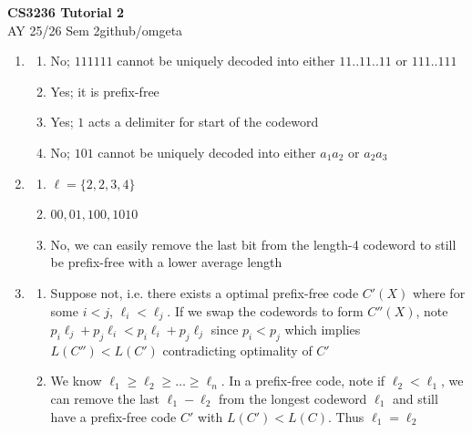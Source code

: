 \documentclass[12pt, a4paper]{article}
\newcommand{\mytitle}{CS3236 Tutorial 2}
\newcommand{\myauthor}{github/omgeta}
\newcommand{\mydate}{AY 25/26 Sem 2}
\begin{document}
\raggedright
\footnotesize
\begin{center}
{\normalsize{\textbf{\mytitle}}} \\
{\footnotesize{\mydate\hspace{2pt}\textemdash\hspace{2pt}\myauthor}}
\end{center}
\begin{enumerate}[Q\arabic*.]
  \item 
    \begin{enumerate}
      \item No; $111111$ cannot be uniquely decoded into either $11..11..11$ or $111..111$
      \item Yes; it is prefix-free 
      \item Yes; $1$ acts a delimiter for start of the codeword
      \item No; $101$ cannot be uniquely decoded into either $a_1a_2$ or $a_2a_3$
    \end{enumerate}

  \item 
    \begin{enumerate}
      \item $\ell =\{2, 2, 3, 4\}$
      \item $00, 01, 100, 1010$
      \item No, we can easily remove the last bit from the length-4 codeword to still be prefix-free with a lower average length
    \end{enumerate}

  \item 
    \begin{enumerate}
      \item Suppose not, i.e. there exists a optimal prefix-free code $C'(X)$ where for some $i < j$, $\ell_i < \ell_j$. If we swap the codewords to form $C''(X)$, note $p_i \ell_j + p_j \ell_i < p_i \ell_i + p_j \ell_j$ since $p_i < p_j$ which implies $L(C'') < L(C')$ contradicting optimality of $C'$

      \item We know $\ell_1 \geq \ell_2 \geq \dots \geq \ell_n$. In a prefix-free code, note if $\ell_2 < \ell_1$, we can remove the last $\ell_1-\ell_2$ from the longest codeword $\ell_1$  and still have a prefix-free code $C'$ with $L(C') < L(C)$. Thus $\ell_1 = \ell_2$ 
    \end{enumerate}


\end{enumerate}
\end{document}
